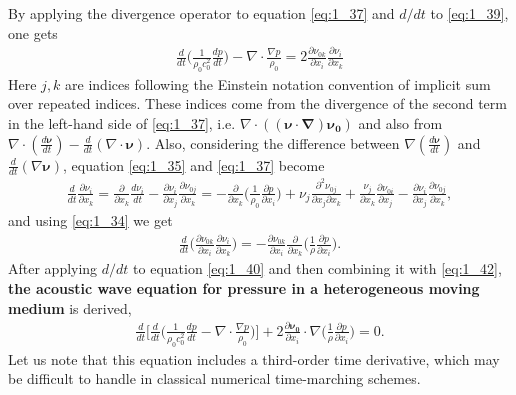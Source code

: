         By applying the divergence operator to equation \ref{eq:1_37} and $d/dt$ to \ref{eq:1_39}, one gets
        \begin{align} \label{eq:1_40}
            \frac{d}{d t}\biggl( \frac{1}{\rho_0 c_0^2}\frac{d p}{d t} \biggr) - \nabla\cdot\frac{\nabla p}{\rho_0} =2\frac{\partial \nu_{0k}}{\partial
x_i}\frac{\partial \nu_i}{\partial x_k}
        \end{align}
        Here $j,k$ are indices following the Einstein notation convention of implicit sum over repeated indices.
These indices come from the divergence of the second term in the left-hand side of \ref{eq:1_37}, i.e.
$\nabla\cdot((\bm{\nu\cdot\nabla})\bm{\nu_0})$ and also from $\nabla\cdot(\frac{d\bm{\nu}}{d t})-\frac{d}{d t}(\nabla\cdot\bm{\nu})$. Also, considering the
difference between $\nabla(\frac{d\bm{\nu}}{d t})$ and $\frac{d}{d t}(\nabla\bm{\nu})$, equation \ref{eq:1_35} and \ref{eq:1_37} become
        \begin{align} \label{eq:1_41}
            \frac{d}{d t}\frac{\partial \nu_i}{\partial x_k}=\frac{\partial}{\partial x_k}\frac{d \nu_i}{d t}-\frac{\partial \nu_i}{\partial x_j}\frac{\partial
\nu_{0j}}{\partial x_k}
            =-\frac{\partial}{\partial x_k}\biggl(\frac{1}{\rho_0}\frac{\partial p}{\partial x_i}\biggr)+\nu_j\frac{\partial^2 \nu_{0j}}{\partial x_j \partial
x_k}+\frac{\nu_j}{\partial x_k}\frac{\partial \nu_{0i}}{\partial{x_j}}-\frac{\partial \nu_i}{\partial x_j}\frac{\partial \nu_{0j}}{\partial x_k},
        \end{align}
        and using \ref{eq:1_34} we get
        \begin{align} \label{eq:1_42}
            \frac{d}{d t}\biggl( \frac{\partial \nu_{0k}}{\partial x_i}\frac{\partial \nu_i}{\partial x_k} \biggr) = -\frac{\partial \nu_{0k}}{\partial
x_i}\frac{\partial}{\partial x_k}\biggl(\frac{1}{\rho}\frac{\partial p}{\partial x_i}\biggr).
        \end{align}
        After applying $d/dt$ to equation \ref{eq:1_40} and then combining it with \ref{eq:1_42}, \textbf{the acoustic wave equation for pressure in a heterogeneous moving medium} is derived,
        \begin{align} \label{eq:1_43}
            \frac{d}{d t}\biggl[ \frac{d}{d t}\biggl( \frac{1}{\rho_0 c_0^2}\frac{d p}{d t}- \nabla\cdot \frac{\nabla p}{\rho_0}\biggr)\biggr]+2\frac{\partial
\bm{\nu_0}}{\partial x_i}\cdot\nabla\biggl(\frac{1}{\rho}\frac{\partial p}{\partial x_i}\biggr)=0.
        \end{align}
        Let us note that this equation includes a third-order time derivative, which may be difficult to handle in classical numerical time-marching schemes.


